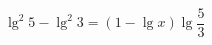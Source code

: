 \begin{ex}[type=equation]
	\begin{condition}
		$\lg^2 5 - \lg^2 3 = (1 - \lg x)\lg \dfrac{5}{3}$
	\end{condition}
\end{ex}